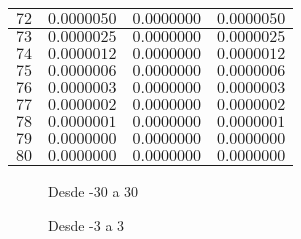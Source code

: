 \begin{center}
\begin{longtable}{|c|c|c|c|}
		$72$ & $0.0000050$ & $0.0000000$ & $0.0000050$ \\ \hline
		$73$ & $0.0000025$ & $0.0000000$ & $0.0000025$ \\ \hline
		$74$ & $0.0000012$ & $0.0000000$ & $0.0000012$ \\ \hline
		$75$ & $0.0000006$ & $0.0000000$ & $0.0000006$ \\ \hline
		$76$ & $0.0000003$ & $0.0000000$ & $0.0000003$ \\ \hline
		$77$ & $0.0000002$ & $0.0000000$ & $0.0000002$ \\ \hline
		$78$ & $0.0000001$ & $0.0000000$ & $0.0000001$ \\ \hline
		$79$ & $0.0000000$ & $0.0000000$ & $0.0000000$ \\ \hline
		$80$ & $0.0000000$ & $0.0000000$ & $0.0000000$ \\ \hline
	\end{longtable}
\end{center}


\begin{figure}[H]
	\centering
	\begin{minipage}{0.45\textwidth}
		\caption{Desde -30 a 30}		
	\end{minipage}\hfill
	\begin{minipage}{0.45\textwidth}
		\caption{Desde -3 a 3}
	\end{minipage}
\end{figure}

